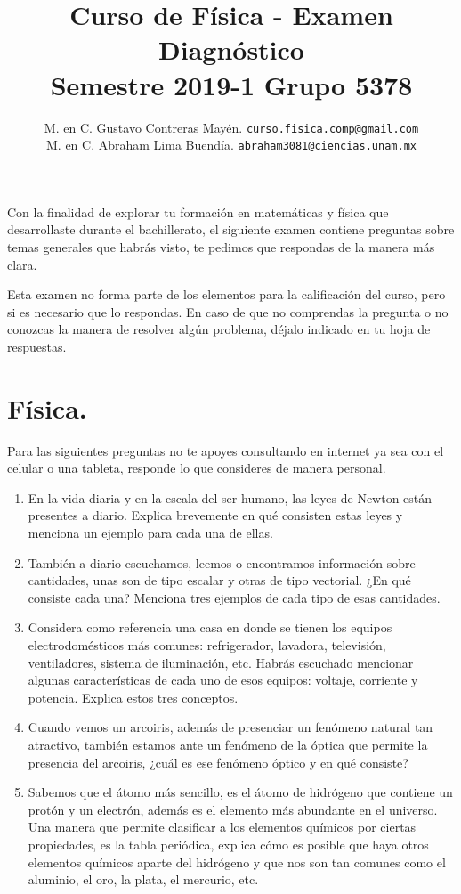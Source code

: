 \documentclass[12pt]{article}
\author{M. en C. Gustavo Contreras Mayén. \texttt{curso.fisica.comp@gmail.com}\\
    M. en C. Abraham Lima Buendía. \texttt{abraham3081@ciencias.unam.mx}}
\title{Curso de Física - Examen Diagnóstico\\{\large Semestre 2019-1 Grupo 5378}}
\date{ }
\begin{document}
\renewcommand\labelenumii{\theenumi.{\arabic{enumii}}}
\maketitle
\fontsize{14}{14}\selectfont
Con la finalidad de explorar tu formación en matemáticas y física que desarrollaste durante el bachillerato, el siguiente examen contiene preguntas sobre temas generales que habrás visto, te pedimos que respondas de la manera más clara.

Esta examen no forma parte de los elementos para la calificación del curso, pero si es necesario que lo respondas. En caso de que no comprendas la pregunta o no conozcas la manera de resolver algún problema, déjalo indicado en tu hoja de respuestas.

\section{Física.}
Para las siguientes preguntas no te apoyes consultando en internet ya sea con el celular o una tableta, responde lo que consideres de manera personal.
\begin{enumerate}
\item En la vida diaria y en la escala del ser humano, las leyes de Newton están presentes a diario. Explica brevemente en qué consisten estas leyes y menciona un ejemplo para cada una de ellas.
\item También a diario escuchamos, leemos o encontramos información sobre cantidades, unas son de tipo escalar y otras de tipo vectorial. ¿En qué consiste cada una? Menciona tres ejemplos de cada tipo de esas cantidades.
\item Considera como referencia una casa en donde se tienen los equipos electrodomésticos más comunes: refrigerador, lavadora, televisión, ventiladores, sistema de iluminación, etc. Habrás escuchado mencionar algunas características de cada uno de esos equipos: voltaje, corriente y potencia. Explica estos tres conceptos.
\item Cuando vemos un arcoiris, además de presenciar un fenómeno natural tan atractivo, también estamos ante un fenómeno de la óptica que permite la presencia del arcoiris, ¿cuál es ese fenómeno óptico y en qué consiste?
\item Sabemos que el átomo más sencillo, es el átomo de hidrógeno que contiene un protón y un electrón, además es el elemento más abundante en el universo. Una manera que permite clasificar a los elementos químicos por ciertas propiedades, es la tabla periódica, explica cómo es posible que haya otros elementos químicos aparte del hidrógeno y que nos son tan comunes como el aluminio, el oro, la plata, el mercurio, etc.
\end{enumerate}
\end{document}
